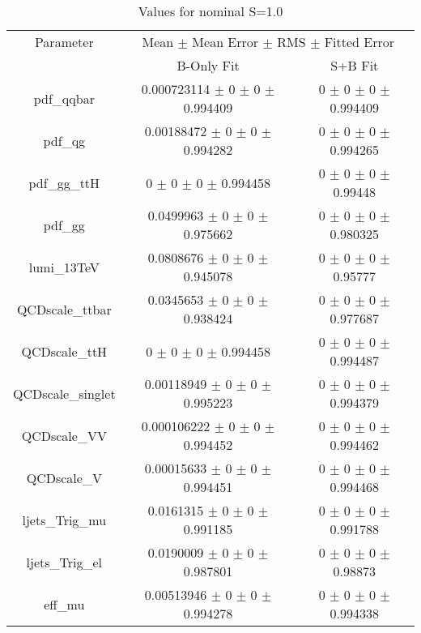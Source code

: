\begin{table}
\centering
\caption{Values for nominal S=1.0}
\begin{tabular}{ccc}
\toprule
Parameter & \multicolumn{2}{c}{Mean $\pm$ Mean Error $\pm$ RMS $\pm$ Fitted Error}\\
 & B-Only Fit & S+B Fit\\
\midrule
pdf\_qqbar & \num{0.000723114} $\pm$ \num{0} $\pm$ \num{0} $\pm$ \num{0.994409} & \num{0} $\pm$ \num{0} $\pm$ \num{0} $\pm$ \num{0.994409}\\
pdf\_qg & \num{0.00188472} $\pm$ \num{0} $\pm$ \num{0} $\pm$ \num{0.994282} & \num{0} $\pm$ \num{0} $\pm$ \num{0} $\pm$ \num{0.994265}\\
pdf\_gg\_ttH & \num{0} $\pm$ \num{0} $\pm$ \num{0} $\pm$ \num{0.994458} & \num{0} $\pm$ \num{0} $\pm$ \num{0} $\pm$ \num{0.99448}\\
pdf\_gg & \num{0.0499963} $\pm$ \num{0} $\pm$ \num{0} $\pm$ \num{0.975662} & \num{0} $\pm$ \num{0} $\pm$ \num{0} $\pm$ \num{0.980325}\\
lumi\_13TeV & \num{0.0808676} $\pm$ \num{0} $\pm$ \num{0} $\pm$ \num{0.945078} & \num{0} $\pm$ \num{0} $\pm$ \num{0} $\pm$ \num{0.95777}\\
QCDscale\_ttbar & \num{0.0345653} $\pm$ \num{0} $\pm$ \num{0} $\pm$ \num{0.938424} & \num{0} $\pm$ \num{0} $\pm$ \num{0} $\pm$ \num{0.977687}\\
QCDscale\_ttH & \num{0} $\pm$ \num{0} $\pm$ \num{0} $\pm$ \num{0.994458} & \num{0} $\pm$ \num{0} $\pm$ \num{0} $\pm$ \num{0.994487}\\
QCDscale\_singlet & \num{0.00118949} $\pm$ \num{0} $\pm$ \num{0} $\pm$ \num{0.995223} & \num{0} $\pm$ \num{0} $\pm$ \num{0} $\pm$ \num{0.994379}\\
QCDscale\_VV & \num{0.000106222} $\pm$ \num{0} $\pm$ \num{0} $\pm$ \num{0.994452} & \num{0} $\pm$ \num{0} $\pm$ \num{0} $\pm$ \num{0.994462}\\
QCDscale\_V & \num{0.00015633} $\pm$ \num{0} $\pm$ \num{0} $\pm$ \num{0.994451} & \num{0} $\pm$ \num{0} $\pm$ \num{0} $\pm$ \num{0.994468}\\
ljets\_Trig\_mu & \num{0.0161315} $\pm$ \num{0} $\pm$ \num{0} $\pm$ \num{0.991185} & \num{0} $\pm$ \num{0} $\pm$ \num{0} $\pm$ \num{0.991788}\\
ljets\_Trig\_el & \num{0.0190009} $\pm$ \num{0} $\pm$ \num{0} $\pm$ \num{0.987801} & \num{0} $\pm$ \num{0} $\pm$ \num{0} $\pm$ \num{0.98873}\\
eff\_mu & \num{0.00513946} $\pm$ \num{0} $\pm$ \num{0} $\pm$ \num{0.994278} & \num{0} $\pm$ \num{0} $\pm$ \num{0} $\pm$ \num{0.994338}\\

\end{tabular}
\end{table}
